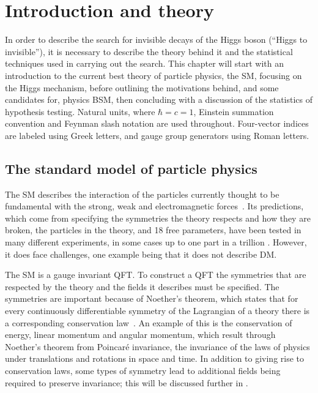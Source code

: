 \chapter{Introduction and theory}
\label{chap:theory}
In order to describe the search for invisible decays of the Higgs boson (``Higgs to invisible''), it is necessary to describe the theory behind it and the statistical techniques used in carrying out the search. This chapter will start with an introduction to the current best theory of particle physics, the \ac{SM}, focusing on the Higgs mechanism, before outlining the motivations behind, and some candidates for, physics \ac{BSM}, then concluding with a discussion of the statistics of hypothesis testing. Natural units, where $\hbar=c=1$, Einstein summation convention and Feynman slash notation are used throughout. Four-vector indices are labeled using Greek letters, and gauge group generators using Roman letters.


\section{The standard model of particle physics}
\label{sec:SM}
The SM describes the interaction of the particles currently thought to be fundamental with the strong, weak and electromagnetic forces~\cite{GlashowPartialSymmetries,WeinbergModelOfLeptons,SalamNobelSymposium,eightfoldway}. Its predictions, which come from specifying the symmetries the theory respects and how they are broken, the particles in the theory, and 18 free parameters, have been tested in many different experiments, in some cases up to one part in a trillion \cite{PhysRevLett.100.120801}. However, it does face challenges, one example being that it does not describe \ac{DM}. 

The SM is a gauge invariant \ac{QFT}. To construct a QFT the symmetries that are respected by the theory and the fields it describes must be specified. The symmetries are important because of Noether's theorem, which states that for every continuously differentiable symmetry of the Lagrangian of a theory there is a corresponding conservation law~\cite{Noether:1918zz,doi:10.1080/00411457108231446}. An example of this is the conservation of energy, linear momentum and angular momentum, which result through Noether's theorem from Poincar\'e invariance, the invariance of the laws of physics under translations and rotations in space and time. In addition to giving rise to conservation laws, some types of symmetry lead to additional fields being required to preserve invariance; this will be discussed further in  \cite{PhysRev.96.191}.

